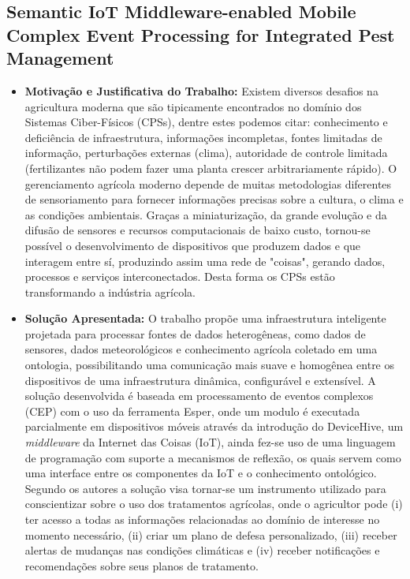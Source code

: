 \documentclass[tid,table]{texufpel} %
\begin{document}
\subsection{Semantic IoT Middleware-enabled Mobile Complex Event Processing for Integrated Pest Management}

\begin{itemize}
	\item \textbf{Motivação e Justificativa do Trabalho:} Existem diversos desafios na agricultura moderna que são tipicamente encontrados no domínio dos Sistemas Ciber-Físicos (CPSs), dentre estes podemos citar: conhecimento e deficiência de infraestrutura, informações incompletas, fontes limitadas de informação, perturbações externas (clima), autoridade de controle limitada (fertilizantes não podem fazer uma planta crescer arbitrariamente rápido). O gerenciamento agrícola moderno depende  de muitas metodologias diferentes de sensoriamento para fornecer informações precisas sobre a cultura, o clima e as condições ambientais. Graças a miniaturização, da grande evolução e da difusão de sensores e recursos computacionais de baixo custo, tornou-se possível o desenvolvimento de dispositivos que produzem dados e que interagem entre sí, produzindo assim uma rede de "coisas", gerando dados, processos e serviços interconectados. Desta forma os CPSs estão transformando a indústria agrícola.
	
	\item \textbf{Solução Apresentada:} O trabalho propõe uma infraestrutura inteligente projetada para processar fontes de dados heterogêneas, como dados de sensores, dados meteorológicos e conhecimento agrícola coletado em uma ontologia, possibilitando uma comunicação mais suave e homogênea entre os dispositivos de uma infraestrutura dinâmica, configurável e extensível. A solução desenvolvida é baseada em processamento de eventos complexos (CEP) com o uso da ferramenta Esper, onde um modulo é executada parcialmente em dispositivos móveis através da introdução do DeviceHive, um \textit{middleware} da Internet das Coisas (IoT), ainda fez-se uso de uma linguagem de programação com suporte a mecanismos de reflexão, os quais servem como uma interface entre os componentes da IoT e o conhecimento ontológico. Segundo os autores a solução visa tornar-se um instrumento utilizado para conscientizar sobre o uso dos tratamentos agrícolas, onde o agricultor pode (i) ter acesso a todas as informações relacionadas ao domínio de interesse no momento necessário, (ii) criar um plano de defesa personalizado, (iii) receber alertas de mudanças nas condições climáticas e (iv) receber notificações e recomendações sobre seus planos de tratamento.


\end{itemize}
\end{document}
